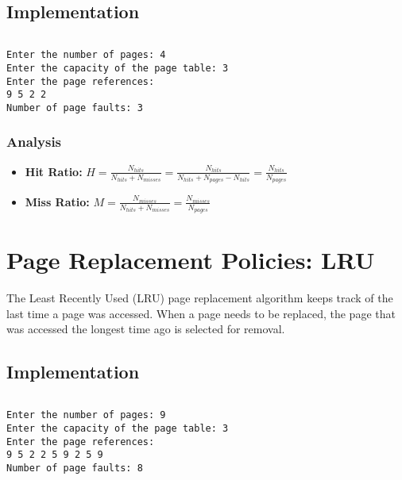\subsection{Implementation}

\inputminted[fontsize=\footnotesize]{c}{code/page_fifo.c}

\begin{lstlisting}[style=output]
Enter the number of pages: 4
Enter the capacity of the page table: 3
Enter the page references:
9 5 2 2
Number of page faults: 3
\end{lstlisting}

\subsubsection{Analysis}

\begin{itemize}
	\item \textbf{Hit Ratio:} $H = \frac{N_{hits}}{N_{hits} + N_{misses}} = \frac{N_{hits}}{N_{hits} + N_{pages} - N_{hits}} = \frac{N_{hits}}{N_{pages}}$
	\item \textbf{Miss Ratio:} $M = \frac{N_{misses}}{N_{hits} + N_{misses}} = \frac{N_{misses}}{N_{pages}}$
\end{itemize}


\section{Page Replacement Policies: LRU}
\label{sec:page-replacement-lru}

The Least Recently Used (LRU) page replacement algorithm
keeps track of the last time a page was accessed.
When a page needs to be replaced, the page that was accessed the longest time ago is selected for removal.

\subsection{Implementation}

\inputminted[fontsize=\footnotesize]{c}{code/page_lru.c}

\begin{lstlisting}[style=output]
Enter the number of pages: 9
Enter the capacity of the page table: 3
Enter the page references:
9 5 2 2 5 9 2 5 9
Number of page faults: 8
\end{lstlisting}
